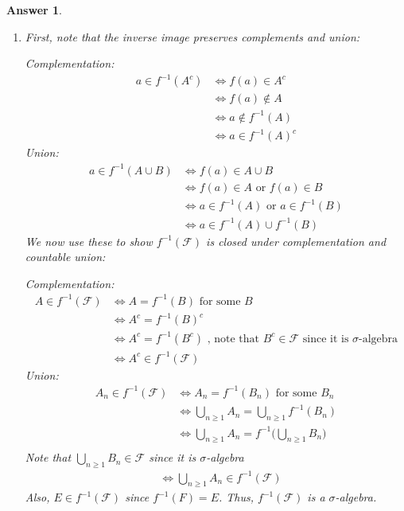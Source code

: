 \documentclass[12pt]{article}
\theoremstyle{colon}
\newtheorem*{answer}{Answer}
\begin{document}
\begin{answer}
  \leavevmode
  \begin{enumerate}[label=(\roman*)]
    \item First, note that the inverse image preserves complements and union:
      \par
      Complementation:
      \begin{align*}
        a \in f^{-1}(A^c) &\Longleftrightarrow f(a) \in A^c \\
        &\Longleftrightarrow f(a) \notin A \\
        &\Longleftrightarrow a \notin f^{-1}(A) \\
        &\Longleftrightarrow a \in f^{-1}(A)^c
      \end{align*}
      Union:
      \begin{align*}
        a \in f^{-1}(A \cup B) &\Longleftrightarrow f(a) \in A \cup B \\
        &\Longleftrightarrow f(a) \in A \text{ or } f(a) \in B \\
        &\Longleftrightarrow a \in f^{-1}(A) \text{ or } a \in f^{-1}(B) \\
        &\Longleftrightarrow a \in f^{-1}(A) \cup f^{-1}(B)
      \end{align*}
      We now use these to show $f^{-1}(\mathcal{F})$ is closed under complementation and countable union:
      \par
      Complementation:
      \begin{align*}
        A \in f^{-1}(\mathcal{F}) &\Longleftrightarrow A = f^{-1}(B) \text{ for some } B \\
        &\Longleftrightarrow A^c = f^{-1}(B)^c \\
        &\Longleftrightarrow A^c = f^{-1}(B^c) \text{ , note that } B^c \in \mathcal{F} \text{ since it is $\sigma$-algebra} \\
        &\Longleftrightarrow A^c \in f^{-1}(\mathcal{F})
      \end{align*}
      Union:
      \begin{align*}
        A_n \in f^{-1}(\mathcal{F}) &\Longleftrightarrow A_n = f^{-1}(B_n) \text{ for some } B_n \\
        &\Longleftrightarrow \bigcup_{n \geq 1} A_n = \bigcup_{n \geq 1} f^{-1}(B_n) \\
        &\Longleftrightarrow \bigcup_{n \geq 1} A_n = f^{-1}\big(\bigcup_{n \geq 1} B_n \big) \\
      \end{align*}
      Note that $\bigcup_{n \geq 1} B_n \in \mathcal{F}$ since it is $\sigma$-algebra
      \begin{align*}
        &\Longleftrightarrow \bigcup_{n \geq 1} A_n  \in f^{-1}(\mathcal{F})
      \end{align*}
      Also, $E \in f^{-1}(\mathcal{F})$ since $f^{-1}(F) = E$. Thus, $f^{-1}(\mathcal{F})$ is a $\sigma$-algebra.


\end{enumerate}
\end{answer}
\end{document}
